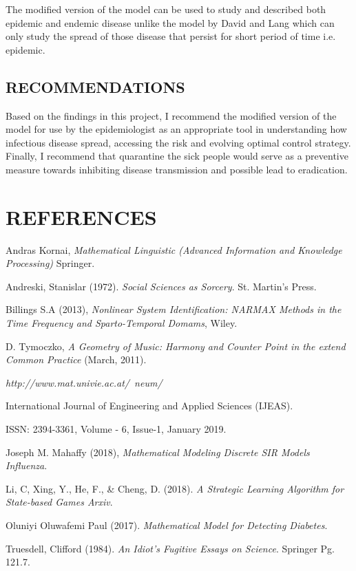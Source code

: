 \documentclass[12pt]{report}
\newcommand{\NI}{\noindent}
\begin{document}
	\NI The modified version of the model can be used to study and described both epidemic and endemic disease unlike the model by David and Lang which can only study the spread of those disease that persist for short period of time i.e. epidemic.\\
	
	\section{RECOMMENDATIONS}
	Based on the findings in this project, I recommend the modified version of the model for use by the epidemiologist as an appropriate tool in understanding how infectious disease spread, accessing the risk and evolving optimal control strategy.\\
	
	\NI Finally, I recommend that quarantine the sick people would serve as a preventive measure towards inhibiting disease transmission and possible lead to eradication.
	
	
	\chapter*{REFERENCES}
	\begin{description}
		\item Andras Kornai, \textit{Mathematical Linguistic (Advanced Information and Knowledge Processing)} Springer.
		
		\item Andreski, Stanislar (1972). \textit{Social Sciences as Sorcery}. St. Martin's Press.
		
		\item Billings S.A (2013), \textit{Nonlinear System Identification: NARMAX Methods in the Time Frequency and Sparto-Temporal Domams}, Wiley.
		
		\item D. Tymoczko, \textit{A Geometry of Music: Harmony and Counter Point in the extend Common Practice} (March, 2011).
		
		\item \textit{http://www.mat.univie.ac.at/~neum/}
		
		\item International Journal of Engineering and Applied Sciences (IJEAS).
		
		\item ISSN: 2394-3361, Volume - 6, Issue-1, January 2019.
		
		\item Joseph M. Mahaffy (2018), \textit{Mathematical Modeling Discrete SIR Models Influenza}.
		
		\item Li, C, Xing, Y., He, F., \& Cheng, D. (2018). \textit{A Strategic Learning Algorithm for State-based Games Arxiv}. 
		
		\item Oluniyi Oluwafemi Paul (2017). \textit{Mathematical Model for Detecting Diabetes}.
		
		\item Truesdell, Clifford (1984). \textit{An Idiot's Fugitive Essays on Science}. Springer Pg. 121.7.
	\end{description}
\end{document}
